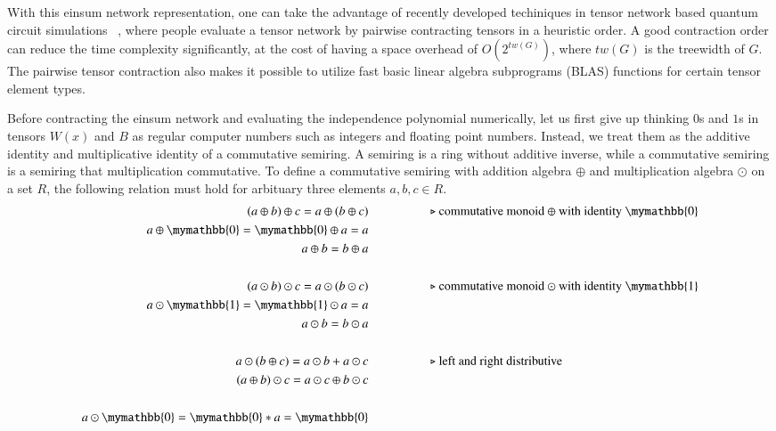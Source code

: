 \documentclass{article}
\newcommand{\<}{\langle}
\renewcommand{\>}{\rangle}
\renewcommand{\cite}[1]{{\citep{#1}}}
\theoremstyle{definition}\newtheorem{definition}{\textit{Definition}}
\begin{document}
With this einsum network representation, one can take the advantage of recently developed techiniques in tensor network based quantum circuit simulations ~\cite{Gray2021,Pan2021},
where people evaluate a tensor network by pairwise contracting tensors in a heuristic order.
A good contraction order can reduce the time complexity significantly, at the cost of having a space overhead of $O(2^{tw(G)})$, where $tw(G)$ is the treewidth of $G$.~\cite{Markov2008}
The pairwise tensor contraction also makes it possible to utilize fast basic linear algebra subprograms (BLAS) functions for certain tensor element types.

Before contracting the einsum network and evaluating the independence polynomial numerically, let us first give up thinking $0$s and $1$s in tensors $W(x)$ and $B$ as regular computer numbers such as integers and floating point numbers.
Instead, we treat them as the additive identity and multiplicative identity of a commutative semiring.
A semiring is a ring without additive inverse, while a commutative semiring is a semiring that multiplication commutative.
To define a commutative semiring with addition algebra $\oplus$ and multiplication algebra $\odot$ on a set $R$, the following relation must hold for arbituary three elements $a, b, c \in R$.
\begin{align*}
(a \oplus b) \oplus c = a \oplus (b \oplus c) & \hspace{5em}\text{$\triangleright$ commutative monoid $\oplus$ with identity $\mymathbb{0}$}\\
a \oplus \mymathbb{0} = \mymathbb{0} \oplus a = a &\\
a \oplus b = b \oplus a &\\
&\\
(a \odot b) \odot c = a \odot (b \odot c)  &   \hspace{5em}\text{$\triangleright$ commutative monoid $\odot$ with identity $\mymathbb{1}$}\\
a \odot  \mymathbb{1} =  \mymathbb{1} \odot a = a &\\
a \odot b = b \odot a &\\
&\\
a \odot (b\oplus c) = a\odot b + a\odot c  &  \hspace{5em}\text{$\triangleright$ left and right distributive}\\
(a\oplus b) \odot c = a\odot c \oplus b\odot c &\\
&\\
a \odot \mymathbb{0} = \mymathbb{0} * a = \mymathbb{0}
\end{align*}
\end{document}
